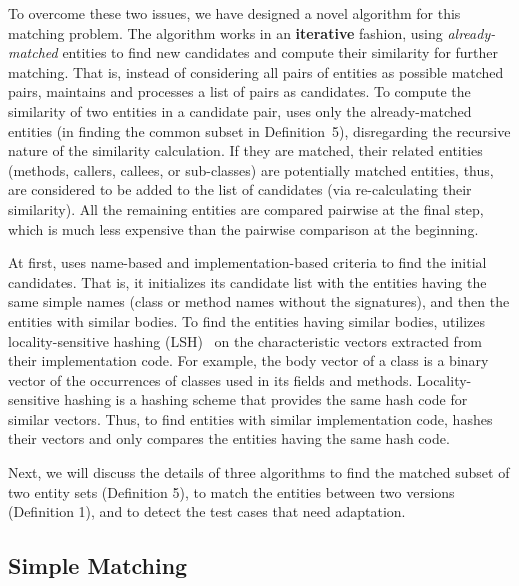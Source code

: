 
To overcome these two issues, we have designed a novel algorithm for
this matching problem. The algorithm works in an {\bf iterative}
fashion, using \emph{already-matched} entities to find new candidates
and compute their similarity for further matching. That is, instead of
considering all pairs of entities as possible matched pairs, {\tool}
maintains and processes a list of pairs as candidates. To compute the
similarity of two entities in a candidate pair, {\tool} uses only the
already-matched entities (\eg in finding the common subset in
Definition~5), disregarding the recursive nature of the similarity
calculation. If they are matched, their related entities
(\eg methods, callers, callees, or sub-classes) are potentially
matched entities, thus, are considered to be added to the list of
candidates (via re-calculating their similarity). All the remaining
entities are compared pairwise at the final step, which is much less
expensive than the pairwise comparison at the beginning.

At first, {\tool} uses name-based and implementation-based criteria to
find the initial candidates. That is, it initializes its candidate
list with the entities having the same simple names (class or
method names without the signatures), and then the entities with
similar bodies. To find the entities having similar bodies, {\tool}
utilizes locality-sensitive hashing (LSH)~\cite{lsh} on the
characteristic vectors extracted from their implementation code. For
example, the body vector of a class is a binary vector of the
occurrences of classes used in its fields and
methods. Locality-sensitive hashing is a hashing scheme that provides
the same hash code for similar vectors. Thus, to find entities with
similar implementation code, {\tool} hashes their vectors and only
compares the entities having the same hash code.

Next, we will discuss the details of three algorithms to find the
matched subset of two entity sets (Definition 5), to match the
entities between two versions (Definition 1), and to detect the test
cases that need adaptation.

\subsection{Simple Matching}
\label{simplematch}

